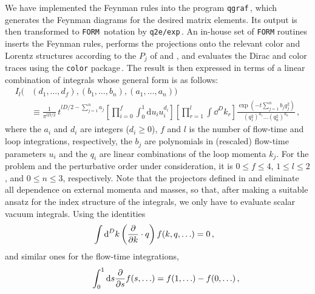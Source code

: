 We have implemented the Feynman rules into the program
\texttt{qgraf}\,\cite{Nogueira:1991ex,Nogueira:2006pq}, which generates
the Feynman diagrams for the desired matrix elements. Its output is then
transformed to \texttt{FORM}\,\cite{Vermaseren:2000nd,Kuipers:2012rf}
notation by
\texttt{q2e/exp}\,\cite{Harlander:1997zb,Seidensticker:1999bb}. An
in-house set of \texttt{FORM} routines inserts the Feynman rules,
performs the projections onto the relevant color and Lorentz structures
according to the $P_j$ of  and , and evaluates
the Dirac and color traces using the \texttt{color}
package\,\cite{vanRitbergen:1998pn}.  The result is then expressed in
terms of a linear combination of integrals whose general form is as
follows:
\begin{equation}
  \begin{split}
    I_l( &(d_1, \dots, d_f ), (b_1, \dots, b_n ), ( a_1, \dots, a_n ))
    \\ &\equiv \frac{1}{\pi^{lD/2}} \, t^{lD/2-\sum_{j=1}^n a_j} \left[\prod_{i=0}^f
     \int_0^1 \mathrm{d}u_i u_i^{d_i} \right]
    \left[\prod_{r=1}^l\int\dd^Dk_r\right]\frac{\exp(-t \sum_{j=1}^n b_j
      q_j^2)}{(q_1^2)^{a_1}\dots (q_n^2)^{a_n}}\,,
    \label{eq:fl}
  \end{split}
\end{equation}
where the $a_i$ and $d_i$ are integers ($d_i\geq 0$), $f$ and $l$ is the
number of flow-time and loop integrations, respectively, the $b_j$ are
polynomials in (rescaled) flow-time parameters $u_i$ and the $q_i$ are
linear combinations of the loop momenta $k_j$. For the problem and the
perturbative order under consideration, it is $0\leq f\leq 4$, $1 \leq
l\leq 2$, and $0 \leq n \leq 3$, respectively.  Note that the projectors
defined in  and  eliminate all dependence on
external momenta and masses, so that, after making a suitable ansatz for
the index structure of the integrals, we only have to evaluate scalar
vacuum integrals.  Using the identities\,\cite{Chetyrkin:1981qh}
\begin{equation}
  \begin{split}
    &\int\text{d}^D k \left(\frac{\partial }{\partial k}\cdot q\right) f(k,q,\ldots) =
    0\,,
    \label{eq:ibp}
  \end{split}
\end{equation}
and similar ones for the flow-time integrations,
\begin{equation}
  \begin{split}
    \qquad\int_0^1\text{d} s \frac{\partial }{\partial s} f(s,\ldots) =
    f(1,\ldots)-f(0,\ldots)\,,
    \label{eq:ibpflow}
  \end{split}
\end{equation}

